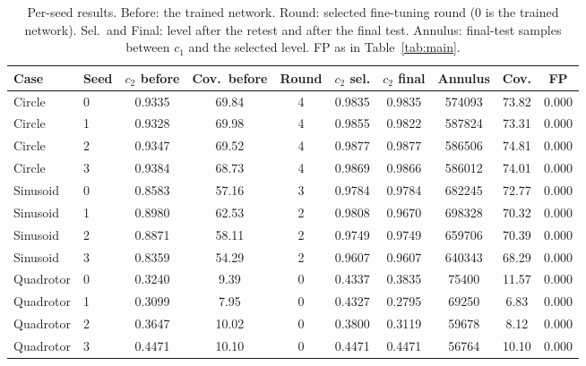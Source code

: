 \begin{table}[ht]
\centering\footnotesize\setlength{\tabcolsep}{3pt}
\caption{Per-seed results. Before: the trained network. Round: selected fine-tuning round (0 is the trained network). Sel.\ and Final: level after the retest and after the final test. Annulus: final-test samples between $c_1$ and the selected level. FP as in Table~\ref{tab:main}.}
\label{tab:seeds}
\begin{tabular}{llcccccccc}
\toprule
Case & Seed & $c_2$ before & Cov.\ before & Round & $c_2$ sel. & $c_2$ final & Annulus & Cov. & FP\\
\midrule
Circle & 0 & 0.9335 & 69.84 & 4 & 0.9835 & 0.9835 & 574093 & 73.82 & 0.000\\
Circle & 1 & 0.9328 & 69.98 & 4 & 0.9855 & 0.9822 & 587824 & 73.31 & 0.000\\
Circle & 2 & 0.9347 & 69.52 & 4 & 0.9877 & 0.9877 & 586506 & 74.81 & 0.000\\
Circle & 3 & 0.9384 & 68.73 & 4 & 0.9869 & 0.9866 & 586012 & 74.01 & 0.000\\
Sinusoid & 0 & 0.8583 & 57.16 & 3 & 0.9784 & 0.9784 & 682245 & 72.77 & 0.000\\
Sinusoid & 1 & 0.8980 & 62.53 & 2 & 0.9808 & 0.9670 & 698328 & 70.32 & 0.000\\
Sinusoid & 2 & 0.8871 & 58.11 & 2 & 0.9749 & 0.9749 & 659706 & 70.39 & 0.000\\
Sinusoid & 3 & 0.8359 & 54.29 & 2 & 0.9607 & 0.9607 & 640343 & 68.29 & 0.000\\
Quadrotor & 0 & 0.3240 & 9.39 & 0 & 0.4337 & 0.3835 & 75400 & 11.57 & 0.000\\
Quadrotor & 1 & 0.3099 & 7.95 & 0 & 0.4327 & 0.2795 & 69250 & 6.83 & 0.000\\
Quadrotor & 2 & 0.3647 & 10.02 & 0 & 0.3800 & 0.3119 & 59678 & 8.12 & 0.000\\
Quadrotor & 3 & 0.4471 & 10.10 & 0 & 0.4471 & 0.4471 & 56764 & 10.10 & 0.000\\
\bottomrule
\end{tabular}
\end{table}
